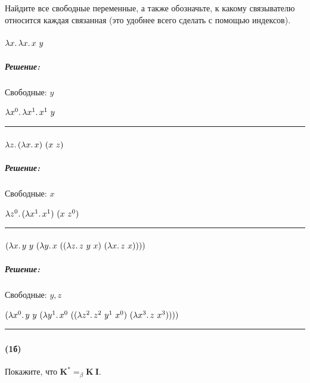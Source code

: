 \documentclass{article}
\newenvironment{proof}{\subparagraph{\hspace{-1em}Решение:\newline}\-}{\par\noindent\rule{\textwidth}{0.4pt}}
\newcommand{\comb}[1]{\mathbf{#1}}
\newcommand{\eqbeta}{=_\beta}
\begin{document}
    Найдите все свободные переменные, а также обозначьте, к какому связывателю относится каждая связанная (это удобнее всего сделать с помощью индексов).

    \paragraph{}

    $\lambda x \ldotp \lambda x \ldotp x~y$

    \begin{proof}
         Свободные: \(y\)

        \(\lambda x^0\ldotp \lambda x^1\ldotp x^1~y\)
    \end{proof}

    \paragraph{}

    $\lambda z \ldotp (\lambda x \ldotp x)~(x~z)$

    \begin{proof}
         Свободные: \(x\)

        \(\lambda z^0 \ldotp (\lambda x^1 \ldotp x^1)~(x~z^0)\)
    \end{proof}

    \paragraph{}

    $(\lambda x\ldotp y~y~(\lambda y\ldotp x~((\lambda z\ldotp z~y~x)~(\lambda x\ldotp z~x))))$

    \begin{proof}
         Свободные: \(y, z\)

        \((\lambda x^0\ldotp y~y~(\lambda y^1\ldotp x^0~((\lambda z^2\ldotp z^2~y^1~x^0)~(\lambda x^3\ldotp z~x^3))))\)
    \end{proof}

    \subsubsection{}

    \paragraph{(1б)}

    Покажите, что $\comb{K}^* \eqbeta \comb{K}~\comb{I}$.
\end{document}
